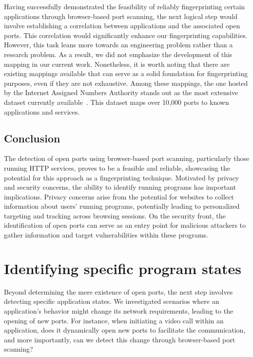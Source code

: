Having successfully demonstrated the feasibility of reliably fingerprinting certain applications through browser-based port scanning, the next logical step would involve establishing a correlation between applications and the associated open ports. This correlation would significantly enhance our fingerprinting capabilities. However, this task leans more towards an engineering problem rather than a research problem. As a result, we did not emphasize the development of this mapping in our current work.
Nonetheless, it is worth noting that there are existing mappings available that can serve as a solid foundation for fingerprinting purposes, even if they are not exhaustive. Among these mappings, the one hosted by the Internet Assigned Numbers Authority stands out as the most extensive dataset currently available~. This dataset maps over 10,000 ports to known applications and services.

\subsection{Conclusion}

The detection of open ports using browser-based port scanning, particularly those running HTTP services, proves to be a feasible and reliable, showcasing the potential for this approach as a fingerprinting technique. 
Motivated by privacy and security concerns, the ability to identify running programs has important implications. Privacy concerns arise from the potential for websites to collect information about users' running programs, potentially leading to personalized targeting and tracking across browsing sessions. On the security front, the identification of open ports can serve as an entry point for malicious attackers to gather information and target vulnerabilities within these programs. 

\section{Identifying specific program states}

Beyond determining the mere existence of open ports, the next step involves detecting specific application states. We investigated scenarios where an application's behavior might change its network requirements, leading to the opening of new ports. For instance, when initiating a video call within an application, does it dynamically open new ports to facilitate the communication, and more importantly, can we detect this change through browser-based port scanning? 

